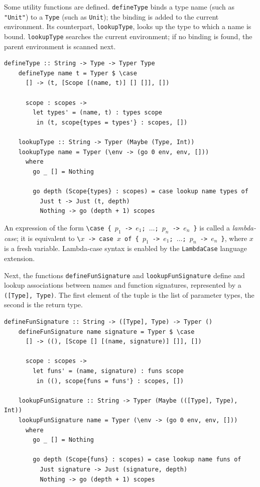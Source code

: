 \documentclass[UdineBachThesis,american,11pt]{PhdThesis}
\begin{document}
  Some utility functions are defined. \mbox{\texttt{defineType}} binds a type
  name (such as \mbox{\texttt{"Unit"}}) to a \mbox{\texttt{Type}} (such as
  \mbox{\texttt{Unit}}); the binding is added to the current environment. Its
  counterpart, \mbox{\texttt{lookupType}}, looks up the type to which a name is
  bound. \mbox{\texttt{lookupType}} searches the current environment; if no
  binding is found, the parent environment is scanned next.

  \begin{Verbatim}[gobble=4,fontsize=\small]
    defineType :: String -> Type -> Typer Type
    defineType name t = Typer $ \case
      [] -> (t, [Scope [(name, t)] [] []], [])

      scope : scopes ->
        let types' = (name, t) : types scope
         in (t, scope{types = types'} : scopes, [])

    lookupType :: String -> Typer (Maybe (Type, Int))
    lookupType name = Typer (\env -> (go 0 env, env, []))
      where
        go _ [] = Nothing

        go depth (Scope{types} : scopes) = case lookup name types of
          Just t -> Just (t, depth)
          Nothing -> go (depth + 1) scopes
  \end{Verbatim}

  An expression of the form
  \mbox{\texttt{\textbackslash case \{ $p_1$ -> $e_1$; $\ldots$; $p_n$ -> $e_n$ \}}}
  is called a \emph{lambda-case}; it is equivalent to
  \mbox{\texttt{\textbackslash $x$ -> case $x$ of \{ $p_1$ -> $e_1$; $\ldots$; $p_n$ -> $e_n$ \}}},
  where $x$ is a fresh variable. Lambda-case syntax is enabled by the
  \mbox{\texttt{LambdaCase}} language extension.

  Next, the functions \mbox{\texttt{defineFunSignature}} and
  \mbox{\texttt{lookupFunSignature}} define and lookup associations between
  names and function signatures, represented by a
  \mbox{\texttt{([Type], Type)}}. The first element of the tuple is the list of
  parameter types, the second is the return type.

  \pagebreak

  \begin{Verbatim}[gobble=4,fontsize=\small]
    defineFunSignature :: String -> ([Type], Type) -> Typer ()
    defineFunSignature name signature = Typer $ \case
      [] -> ((), [Scope [] [(name, signature)] []], [])

      scope : scopes ->
        let funs' = (name, signature) : funs scope
         in ((), scope{funs = funs'} : scopes, [])

    lookupFunSignature :: String -> Typer (Maybe (([Type], Type), Int))
    lookupFunSignature name = Typer (\env -> (go 0 env, env, []))
      where
        go _ [] = Nothing

        go depth (Scope{funs} : scopes) = case lookup name funs of
          Just signature -> Just (signature, depth)
          Nothing -> go (depth + 1) scopes
  \end{Verbatim}
\end{document}
